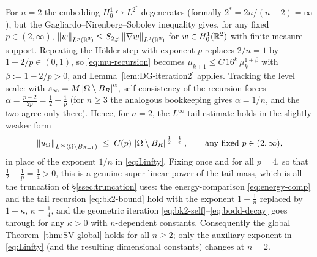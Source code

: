 \begin{remark}[The case $n=2$]\label{rem:n2}
For $n=2$ the embedding $H^1_0\hookrightarrow L^{2^*}$ degenerates
(formally $2^*=2n/(n-2)=\infty$), but the
Gagliardo--Nirenberg--Sobolev inequality gives, for any fixed
$p\in(2,\infty)$,
$\left\|w\right\|_{L^{p}(\mathbb R^2)}\le S_{2,p}\left\|\nabla w\right\|_{L^2(\mathbb R^2)}$ for
$w\in H^1_0(\mathbb R^2)$ with finite-measure support. Repeating the Hölder step
with exponent $p$ replaces $2/n=1$ by $1-2/p\in(0,1)$, so
\eqref{eq:mu-recursion} becomes
$\mu_{k+1}\le C\,16^k\,\mu_k^{1+\beta}$ with $\beta:=1-2/p>0$, and
Lemma~\ref{lem:DG-iteration2} applies. Tracking the level scale: with
$s_\infty=M\left|\Omega\setminus B_R\right|^{\alpha}$, self-consistency of the
recursion forces $\alpha=\tfrac{p-2}{2p}=\tfrac12-\tfrac1p$ (for $n\ge3$
the analogous bookkeeping gives $\alpha=1/n$, and the two agree only there).
Hence, for $n=2$, the $L^\infty$ tail estimate holds in the slightly weaker
form
\[
   \left\|u_\Omega\right\|_{L^\infty(\Omega\setminus B_{R+1})}
   \;\le\;C(p)\,\left|\Omega\setminus B_R\right|^{\,\frac12-\frac1p},
   \qquad\text{any fixed }p\in(2,\infty),
\]
in place of the exponent $1/n$ in \eqref{eq:Linfty}. Fixing once and for
all $p=4$, so that $\tfrac12-\tfrac1p=\tfrac14>0$, this is a genuine
super-linear power of the tail mass, which is all the truncation of
\S\ref{ssec:truncation} uses: the energy-comparison
\eqref{eq:energy-comp} and the tail recursion \eqref{eq:bk2-bound} hold
with the exponent $1+\tfrac1n$ replaced by $1+\kappa$, $\kappa=\tfrac14$,
and the geometric iteration \eqref{eq:bk2-self}--\eqref{eq:bodd-decay} goes
through for any $\kappa>0$ with $n$-dependent constants. Consequently the
global Theorem~\ref{thm:SV-global} holds for all $n\ge2$; only the
auxiliary exponent in \eqref{eq:Linfty} (and the resulting dimensional
constants) changes at $n=2$.
\end{remark}

